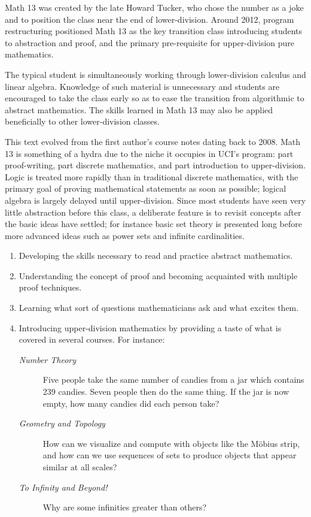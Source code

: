 Math 13 was created by the late Howard Tucker, who chose the number as a joke and to position the class near the end of lower-division. Around 2012, program restructuring positioned Math 13 as the key transition class introducing students to abstraction and proof, and the primary pre-requisite for upper-division pure mathematics.\smallbreak

The typical student is simultaneously working through lower-division calculus and linear algebra. Knowledge of such material is unnecessary and students are encouraged to take the class early so as to ease the transition from algorithmic to abstract mathematics. The skills learned in Math 13 may also be applied beneficially to other lower-division classes.\smallbreak

This text evolved from the first author's course notes dating back to 2008. Math 13 is something of a hydra due to the niche it occupies in UCI's program: part proof-writing, part discrete mathematics, and part introduction to upper-division. Logic is treated more rapidly than in traditional discrete mathematics, with the primary goal of proving mathematical statements as soon as possible; logical algebra is largely delayed until upper-division. Since most students have seen very little abstraction before this class, a deliberate feature is to revisit concepts after the basic ideas have settled; for instance basic set theory is presented long before more advanced ideas such as power sets and infinite cardinalities. 



\begin{enumerate}%
	\item Developing the skills necessary to read and practice abstract mathematics.
	\item Understanding the concept of proof and becoming acquainted with multiple proof techniques.
	\item Learning what sort of questions mathematicians ask and what excites them.
	\item Introducing upper-division mathematics by providing a taste of what is covered in several courses. For instance:
	\begin{description}
		\item[\normalfont\emph{Number Theory}] Five people take the same number of candies from a jar which contains 239 candies. Seven people then do the same thing. If the jar is now empty, how many candies did each person take?
		\item[\normalfont\emph{Geometry and Topology}] How can we visualize and compute with objects like the Möbius strip, and how can we use sequences of sets to produce objects that appear similar at all scales?
		\item[\normalfont\emph{To Infinity and Beyond!}] Why are some infinities greater than others?
	\end{description}
\end{enumerate}


